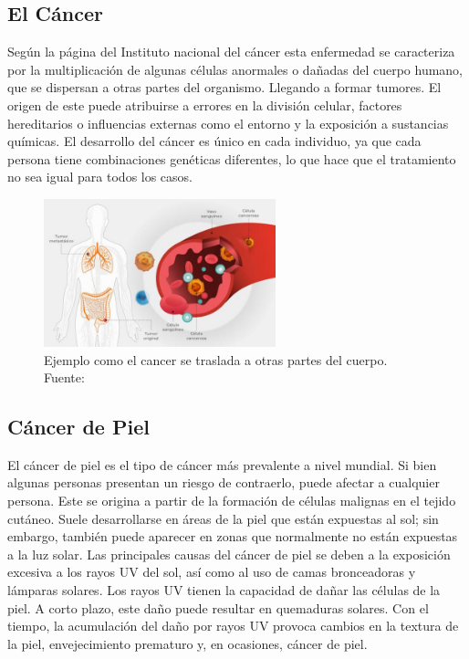 
\subsection{El Cáncer}
Según la página del Instituto nacional del cáncer esta enfermedad se caracteriza por la multiplicación de algunas células anormales o dañadas del cuerpo humano, que se dispersan a otras partes del organismo. Llegando a formar tumores. \parencite{cancer_2024 }
El origen de este puede atribuirse a errores en la división celular, factores hereditarios o influencias externas como el entorno y la exposición a sustancias químicas. El desarrollo del cáncer es único en cada individuo, ya que cada persona tiene combinaciones genéticas diferentes, lo que hace que el tratamiento no sea igual para todos los casos.

\begin{figure}[h]
	\begin{center}
		\includegraphics[width=0.6\textwidth]{2/figuras/imagenes/queeselcancer.jpg}
		\caption{Ejemplo como el cancer se traslada a otras partes del cuerpo. Fuente: \cite{cancer_2024}}
		\label{1:fig 15}
	\end{center}
\end{figure}


\subsection{Cáncer de Piel}
El cáncer de piel es el tipo de cáncer más prevalente a nivel mundial. Si bien algunas personas presentan un riesgo de contraerlo, puede afectar a cualquier persona. Este se origina a partir de la formación de células malignas en el tejido cutáneo.
Suele desarrollarse en áreas de la piel que están expuestas al sol; sin embargo, también puede aparecer en zonas que normalmente no están expuestas a la luz solar.
Las principales causas del cáncer de piel se deben a la exposición excesiva a los rayos UV del sol, así como al uso de camas bronceadoras y lámparas solares. Los rayos UV tienen la capacidad de dañar las células de la piel. A corto plazo, este daño puede resultar en quemaduras solares. Con el tiempo, la acumulación del daño por rayos UV provoca cambios en la textura de la piel, envejecimiento prematuro y, en ocasiones, cáncer de piel. \parencite{cancer_piel_clinic_2024}

